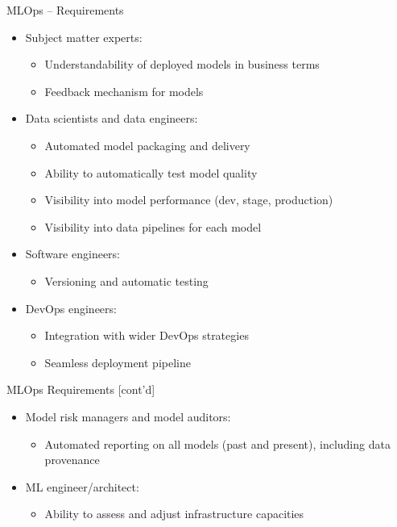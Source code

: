 \documentclass[ignorenonframetext,xcolor=x11names]{beamer}
\begin{document}
\begin{frame}{MLOps -- Requirements}
\begin{itemize}
   \item Subject matter experts:
   \begin{itemize}
  \footnotesize
   \item Understandability of deployed models in business terms
   \item Feedback mechanism for models
   \end{itemize}
   \item Data scientists and data engineers:
   \begin{itemize}
  \footnotesize
   \item Automated model packaging and delivery
   \item Ability to automatically test model quality
   \item Visibility into model performance (dev, stage, production)
   \item Visibility into data pipelines for each model
   \end{itemize}
   \item Software engineers:
   \begin{itemize}
  \footnotesize
   \item Versioning and automatic testing
   \end{itemize}
   \item DevOps engineers:
   \begin{itemize}
  \footnotesize
   \item Integration with wider DevOps strategies
   \item Seamless deployment pipeline
   \end{itemize}
\end{itemize}
\end{frame}

\begin{frame}{MLOps Requirements \small [cont'd]}
\begin{itemize}
   \item Model risk managers and model auditors:
   \begin{itemize}
  \footnotesize
   \item Automated reporting on all models (past and present), including data provenance
   \end{itemize}
   \item ML engineer/architect:
   \begin{itemize}
  \footnotesize
   \item Ability to assess and adjust infrastructure capacities
   \end{itemize}
\end{itemize}
\end{frame}
\end{document}
